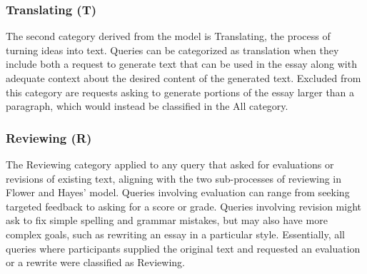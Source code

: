 \documentclass[manuscript,screen,acmsmall]{acmart}
\begin{document}
\subsubsection{Translating (T)}
The second category derived from the model is Translating, the process of turning ideas into text.
Queries can be categorized as translation when they include both a request to generate text that can be used in the essay along with adequate context about the desired content of the generated text.
Excluded from this category are requests asking to generate portions of the essay larger than a paragraph, which would instead be classified in the All category. 


    
\subsubsection{Reviewing (R)}
The Reviewing category applied to any query that asked for evaluations or revisions of existing text, aligning with the two sub-processes of reviewing in Flower and Hayes' model.
Queries involving evaluation can range from seeking targeted feedback to asking for a score or grade.
Queries involving revision might ask to fix simple spelling and grammar mistakes, but may also have more complex goals, such as rewriting an essay in a particular style.
Essentially, all queries where participants supplied the original text and requested an evaluation or a rewrite were classified as Reviewing.
\end{document}
